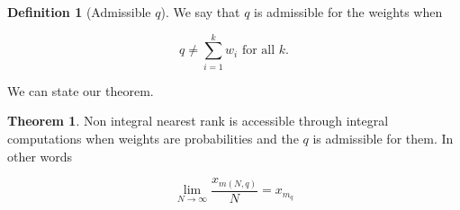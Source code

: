 \documentclass[a4paper,11pt]{article} %
\theoremstyle{definition}
\newtheorem{defn}{Definition}[section]
\newtheorem{theorem}{Theorem}[section]
\theoremstyle{remark}
\begin{document}
\begin{defn}[Admissible $q$]
We say that $q$ is admissible for the weights when

\begin{equation}
q \ne \sum_{i=1}^{k} w_{i} \text{    for all    }  k.
\end{equation}
\end{defn}


We can state our theorem.

\begin{theorem}
Non integral nearest rank is accessible through integral computations when weights are probabilities and the $q$ is admissible for them. In other words

\begin{equation}
\label{newweights}
\lim_{N \rightarrow \infty } \frac{x_{m(N,q) }}{N} = x_{m_{q}}
\end{equation}
\end{theorem}
\end{document}
